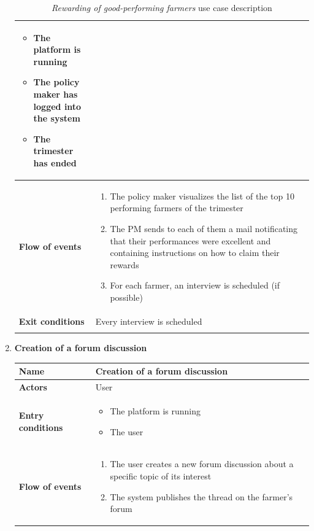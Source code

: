 \documentclass[10pt]{article}
\begin{document}
\begin{enumerate}[label=\textbf{UC\arabic*}]
\begin{longtable}{p{0.26\linewidth}p{0.75\linewidth}}
\begin{itemize}
                \item The platform is running
                \item The policy maker has logged into the system
                \item The trimester has ended
            \end{itemize}\\
            \midrule
            \textbf{Flow of events} & 
            \begin{enumerate}
                \item The policy maker visualizes the list of the top 10 performing farmers of the trimester
                \item The PM sends to each of them a mail notificating that their performances were excellent and containing instructions on how to claim their rewards
                \item For each farmer, an interview is scheduled (if possible)
            \end{enumerate} \\
            \midrule
            \textbf{Exit conditions} & Every interview is scheduled\\
            \midrule
            \bottomrule
            \caption{\emph{Rewarding of good-performing farmers} use case description}
        \end{longtable}
    \newpage
    \item \label{uc:uc8} \textbf{Creation of a forum discussion} 
        \begin{longtable}{p{0.26\linewidth}p{0.75\linewidth}}
            \toprule
            \textbf{Name} & \textbf{Creation of a forum discussion} \\
            \midrule
            \textbf{Actors} & User \\
            \midrule
            \textbf{Entry conditions} & 
            \begin{itemize}
                \item The platform is running
                \item The user
            \end{itemize}\\
            \midrule
            \textbf{Flow of events} & 
            \begin{enumerate}
                \item The user creates a new forum discussion about a specific topic of its interest
                \item The system publishes the thread on the farmer's forum

\end{enumerate}
\end{longtable}
\end{enumerate}
\end{document}
